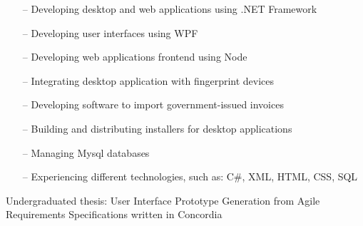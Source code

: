 \documentclass[12pt,a4paper]{altacv}
\begin{document}

\begin{itemize}
    \setlength{\itemindent}{1em}
    \item[--] {Developing desktop and web applications using .NET Framework}
    \item[--] {Developing user interfaces using WPF}
    \item[--] {Developing web applications frontend using Node}
    \item[--] {Integrating desktop application with fingerprint devices}
    \item[--] {Developing software to import government-issued invoices}
    \item[--] {Building and distributing installers for desktop applications}
    \item[--] {Managing Mysql databases}
    \item[--] {Experiencing different technologies, such as: C\#, XML, HTML, CSS, SQL}
\end{itemize}

\medskip






Undergraduated thesis: User Interface Prototype Generation from Agile Requirements Specifications written in Concordia

\clearpage
\end{document}
